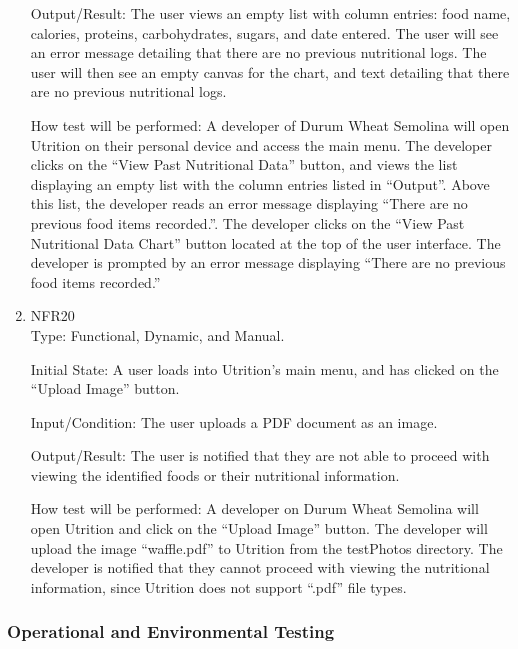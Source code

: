 \documentclass[12pt, titlepage]{article}
\begin{document}
\begin{enumerate}
		Output/Result: The user views an empty list with column entries: food name, calories, proteins, carbohydrates, sugars, and date entered. The user will see an error message detailing that there are no previous nutritional logs. The user will then see an empty canvas for the chart, and text detailing that there are no previous nutritional logs.
		
		How test will be performed: A developer of Durum Wheat Semolina will open Utrition on their personal device and access the main menu. The developer clicks on the “View Past Nutritional Data” button, and views the list displaying an empty list with the column entries listed in “Output”. Above this list, the developer reads an error message displaying “There are no previous food items recorded.”. The developer clicks on the “View Past Nutritional Data Chart” button located at the top of the user interface. The developer is prompted by an error message displaying “There are no previous food items recorded.”
		
		\item{NFR20\\}
		Type: Functional, Dynamic, and Manual.
		
		Initial State: A user loads into Utrition’s main menu, and has clicked on the “Upload Image” button.
		
		Input/Condition: The user uploads a PDF document as an image.
		
		Output/Result: The user is notified that they are not able to proceed with viewing the identified foods or their nutritional information.
		
		How test will be performed: A developer on Durum Wheat Semolina will open Utrition and click on the “Upload Image” button. The developer will upload the image “waffle.pdf” to Utrition from the testPhotos directory. The developer is notified that they cannot proceed with viewing the nutritional information, since Utrition does not support “.pdf” file types.
		
	\end{enumerate}
	
	\subsubsection{Operational and Environmental Testing}
	
	
\end{document}
